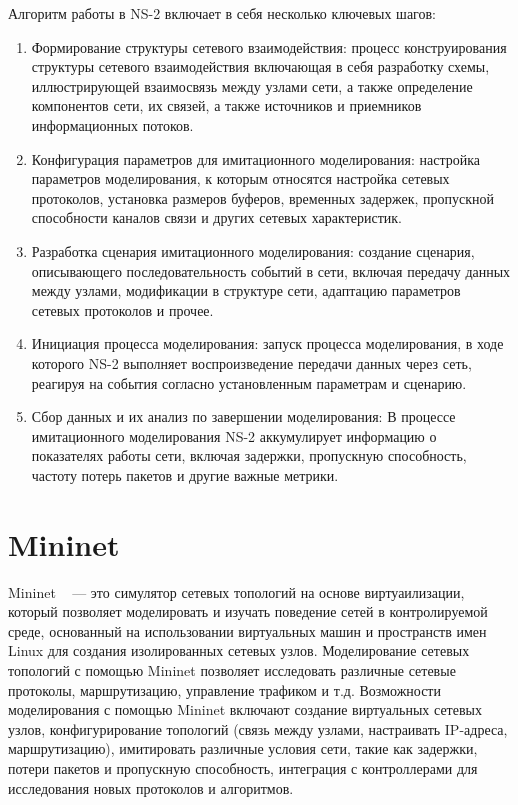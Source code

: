 Алгоритм работы в NS-2 включает в себя несколько ключевых шагов:
\begin{enumerate}
\item Формирование структуры сетевого взаимодействия: процесс конструирования структуры сетевого взаимодействия включающая в себя разработку схемы, 
иллюстрирующей взаимосвязь между узлами сети, а также определение компонентов сети, их связей, а также источников и приемников информационных потоков.
\item Конфигурация параметров для имитационного моделирования: настройка параметров моделирования, к которым относятся настройка сетевых протоколов, 
установка размеров буферов, временных задержек, пропускной способности каналов связи и других сетевых характеристик.
\item Разработка сценария имитационного моделирования: создание сценария, описывающего последовательность событий в сети, включая передачу данных между узлами, 
модификации в структуре сети, адаптацию параметров сетевых протоколов и прочее.
\item Инициация процесса моделирования: запуск процесса моделирования, в ходе которого NS-2 выполняет воспроизведение передачи данных через сеть, реагируя на 
события согласно установленным параметрам и сценарию.
\item Сбор данных и их анализ по завершении моделирования: В процессе имитационного моделирования NS-2 аккумулирует информацию о показателях работы сети, 
включая задержки, пропускную способность, частоту потерь пакетов и другие важные метрики.
\end{enumerate}

\section{Mininet}
\label{chap1:sec2}

Mininet ~\cite{mininet} — это симулятор сетевых топологий на основе виртуаилизации,
который позволяет моделировать и изучать поведение сетей в
контролируемой среде, основанный на использовании виртуальных машин и
пространств имен Linux для создания изолированных сетевых
узлов. Моделирование сетевых топологий с помощью Mininet позволяет
исследовать различные сетевые протоколы, маршрутизацию, управление
трафиком и т.д. Возможности моделирования с помощью Mininet включают
создание виртуальных сетевых узлов, конфигурирование топологий (связь
между узлами, настраивать IP-адреса, маршрутизацию), имитировать
различные условия сети, такие как задержки, потери пакетов и
пропускную способность, интеграция с контроллерами для исследования
новых протоколов и алгоритмов. 

